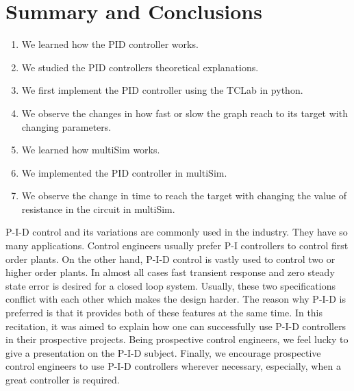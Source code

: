 \chapter{\label{summary}Summary and Conclusions}



\begin{enumerate}
	\item We learned how the PID controller works.
	\item  We studied the PID controllers theoretical explanations.
	\item  We first implement the PID controller using the TCLab in python.
	\item  We observe the changes in how fast or slow the graph reach to its target with changing parameters.
	\item  We learned how multiSim works. 
	\item We implemented the PID controller in multiSim.
	\item  We observe the change in time to reach the target with changing the value of resistance in the circuit in multiSim.
\end{enumerate}

P-I-D  control  and  its  variations  are  commonly  used  in  the  industry.  They  have  so  many applications. Control engineers usually prefer P-I  controllers to control  first order plants.  On the other hand, P-I-D control is vastly used to control two or higher order plants. In almost all cases  fast  transient  response  and  zero  steady  state  error  is  desired  for  a  closed  loop  system.  Usually, these two specifications conflict with each other which makes the design harder. The reason why P-I-D is preferred is that it provides both of these features at the same time.  In  this  recitation,  it  was  aimed  to  explain  how  one  can  successfully  use  P-I-D  controllers  in their prospective projects. Being prospective  control engineers, we feel  lucky  to  give  a  presentation  on  the  P-I-D  subject.  Finally,  we  encourage  prospective control  engineers  to  use  P-I-D  controllers  wherever  necessary,  especially,  when  a  great controller is required.

\setcounter{equation}{0}
\setcounter{table}{0}
\setcounter{figure}{0}


    



